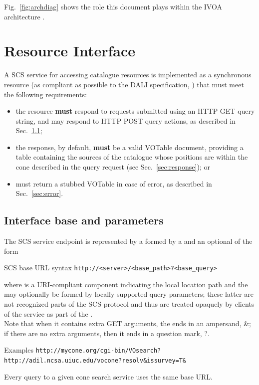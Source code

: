 \documentclass[11pt,a4paper]{ivoa}
\begin{document}
Fig.~\ref{fig:archdiag} shows the role this document plays within the
IVOA architecture \citep{note:VOARCH}.

\section{Resource Interface}
\label{sec:resif}

A SCS service for accessing catalogue resources is implemented as a synchronous resource (as compliant as possible to the DALI specification, \citet{std:DALI}) that must meet the following requirements:
\begin{itemize}
	\item the resource \textbf{must} respond to requests submitted using an HTTP GET query string, and may respond to HTTP POST query actions, as described in Sec.~\ref{sec:basepar};
	\item the response, by default, \textbf{must} be a valid VOTable document, providing a table containing the sources of the catalogue whose positions are within the cone described in the query request (see Sec.~\ref{sec:response}); or
	\item must return a stubbed VOTable in case of error, as described in Sec.~\ref{sec:error}.
\end{itemize}

\subsection{Interface base and parameters}
\label{sec:basepar}
The SCS service endpoint is represented by a  formed by a  and an optional  of the form
\begin{bigdescription}
	\item[SCS base URL syntax] \texttt{http://<server>/<base\_path>?<base\_query>}
\end{bigdescription}
where  is a URI-compliant component indicating the local location path and the  may optionally be formed by locally supported query parameters; these latter are not recognized parts of the SCS protocol and thus are treated opaquely by clients of the service as part of the .\\
Note that when it contains extra GET arguments, the  ends in an ampersand, \&; if there are no extra arguments, then it ends in a question mark, ?.\\
		\begin{bigdescription}
		\item[Examples] \texttt{http://mycone.org/cgi-bin/VOsearch?}\\
		\texttt{http://adil.ncsa.uiuc.edu/vocone?resolv\&issurvey=T\&}
		\end{bigdescription}
Every query to a given cone search service uses the same base URL.
\end{document}
